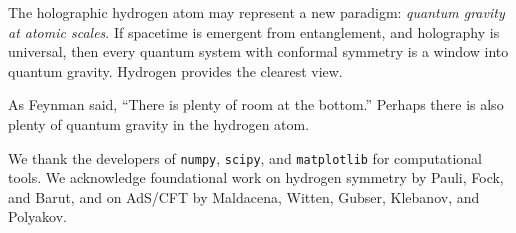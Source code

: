 \documentclass[aps,prd,twocolumn,superscriptaddress,floatfix]{revtex4-2}
\begin{document}
The holographic hydrogen atom may represent a new paradigm: \textit{quantum gravity at atomic scales}. If spacetime is emergent from entanglement, and holography is universal, then every quantum system with conformal symmetry is a window into quantum gravity. Hydrogen provides the clearest view.

As Feynman said, ``There is plenty of room at the bottom.'' Perhaps there is also plenty of quantum gravity in the hydrogen atom.


\begin{acknowledgments}
We thank the developers of \texttt{numpy}, \texttt{scipy}, and \texttt{matplotlib} for computational tools. We acknowledge foundational work on hydrogen symmetry by Pauli, Fock, and Barut, and on AdS/CFT by Maldacena, Witten, Gubser, Klebanov, and Polyakov.
\end{acknowledgments}
\end{document}
